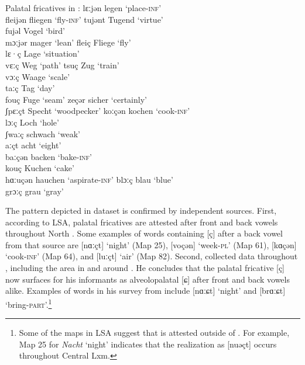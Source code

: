 \ea%
\label{ex:14:40}Palatal fricatives in :
\ea\label{ex:14:40a} lɛːjən \tab legen \tab ‘place\textsc{{}-inf}’ \\
    fleijən \tab fliegen \tab ‘fly\textsc{{}-inf}’ 
\ex\label{ex:14:40b} tujənt \tab Tugend \tab ‘virtue’ \\
    fujəl \tab Vogel \tab ‘bird’ \\
    mɔːjər \tab mager \tab ‘lean’ 
\ex\label{ex:14:40c} fleiç \tab Fliege \tab ‘fly’ \\
    lɛ·ç \tab Lage \tab ‘situation’ \\
    vɛːç \tab Weg \tab ‘path’ 
\ex\label{ex:14:40d} tsuç \tab Zug \tab ‘train’ \\
    vɔːç \tab Waage \tab ‘scale’ \\
    taːç \tab Tag \tab ‘day’ \\
    fouç \tab Fuge \tab ‘seam’ 
\ex\label{ex:14:40e} zeçər \tab sicher \tab ‘certainly’ \\
    ʃpɛːçt \tab Specht \tab ‘woodpecker’ 
\ex\label{ex:14:40f} koːçən \tab kochen \tab ‘cook\textsc{{}-inf}’ \\
    lɔːç \tab Loch \tab ‘hole’ \\
    ʃwaːç \tab schwach \tab ‘weak’ \\
    aːçt \tab acht \tab ‘eight’ \\
    baːçən \tab backen \tab ‘bake\textsc{{}-inf}’ \\
    kouç \tab Kuchen \tab ‘cake’ \\
    hɑːuçən \tab hauchen \tab ‘aspirate\textsc{{}-inf}’ 
\ex\label{ex:14:40g} blɔːç \tab blau \tab ‘blue’ \\
    grɔːç \tab grau \tab ‘gray’ 
\z 
\z 

\begin{sloppypar}
The pattern depicted in dataset  is confirmed by independent sources. First, according to LSA, palatal fricatives are attested after front and back vowels throughout North . Some examples of words containing  [ç] after a back vowel from that source are [nɑːçt] ‘night’ (Map 25), [voçən] ‘week-\textsc{pl}’ (Map 61), [kɑçən] ‘cook\textsc{{}-inf}’ (Map 64), and [luːçt] ‘air’ (Map 82). Second, \citet{Gilles1999} collected data throughout , including the area in and around . He concludes that the palatal fricative [ç] now surfaces for his informants as alveolopalatal [ɕ] after front and back vowels alike. Examples of words in his survey from  include [nɑːɕt] ‘night’ and [brɑːɕt] ‘bring-\textsc{part}’.\footnote{Some of the maps in LSA suggest that  is attested outside of . For example, Map 25 for \textit{Nacht} ‘night’ indicates that the realization as [nuǝçt] occurs throughout Central Lxm.}
\end{sloppypar}

